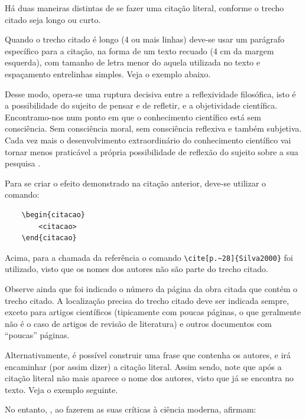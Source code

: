 \begin{apendicesenv}
    Há duas maneiras distintas de se fazer uma citação literal, conforme o trecho citado seja longo ou curto.

    Quando o trecho citado é longo (4 ou mais linhas) deve-se usar um parágrafo específico para a citação, na forma de um texto recuado (4 cm da margem esquerda), com tamanho de letra menor do aquela utilizada no texto e espaçamento entrelinhas simples.
    Veja o exemplo abaixo.

    \begin{citacao}
        Desse modo, opera-se uma ruptura decisiva entre a reflexividade filosófica, isto é a possibilidade do sujeito de pensar e de refletir, e a objetividade científica.     Encontramo-nos num ponto em que o conhecimento científico está sem consciência.
        Sem consciência moral, sem consciência reflexiva e também subjetiva.
        Cada vez mais o desenvolvimento extraordinário do conhecimento científico vai tornar menos praticável a própria possibilidade de reflexão do sujeito sobre a sua pesquisa \cite[p.~28]{Silva2000}.
    \end{citacao}

    Para se criar o efeito demonstrado na citação anterior, deve-se utilizar o comando:

    \begin{verbatim}
    \begin{citacao}
        <citacao>
    \end{citacao}
\end{verbatim}

    Acima, para a chamada da referência o comando \verb|\cite[p.~28]{Silva2000}| foi utilizado, visto que os nomes dos autores não são parte do trecho citado.

    Observe ainda que foi indicado o número da página da obra citada que contém o trecho citado.
    A localização precisa do trecho citado deve ser indicada sempre, exceto para artigos científicos (tipicamente com poucas páginas, o que geralmente não é o caso de artigos de revisão de literatura) e outros documentos com ``poucas'' páginas.

    Alternativamente, é possível construir uma frase que contenha os autores, e irá encaminhar (por assim dizer) a citação literal.
    Assim sendo, note que após a citação literal não mais aparece o nome dos autores, visto que já se encontra no texto.
    Veja o exemplo seguinte.

    No entanto, , ao fazerem as suas críticas à ciência moderna, afirmam:


\end{apendicesenv}
